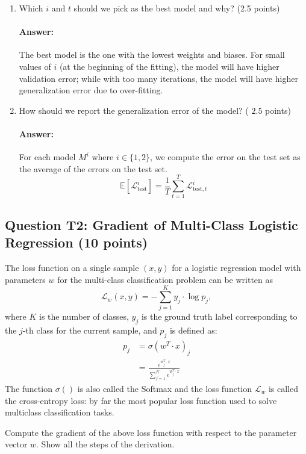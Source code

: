 \documentclass[10pt]{article}
\begin{document}
\begin{enumerate}
  \item Which $i$ and $t$ should we pick as the best model and why? (2.5 points)

  \paragraph{Answer:} The best model is the one with the lowest weights and biases. For small values of $i$ (at the beginning of the fitting), the model will have higher validation error; while with too many iterations, the model will have higher generalization error due to over-fitting.

  \item How should we report the generalization error of the model? ( $2.5$ points)

  \paragraph{Answer:} For each model $M^{i}$ where $i \in\{1,2\}$, we compute the error on the test set as the average of the errors on the test set.
  $$\mathbb{E}[\mathcal{L}_{\text {test}}^{i}] = \frac{1}{T} \sum^T_{t=1} \mathcal{L}_{\text {test}, t}^{i}$$


\end{enumerate}
\subsection*{Question T2: Gradient of Multi-Class Logistic Regression (10 points)}
The loss function on a single sample $(x, y)$ for a logistic regression model with parameters $w$ for the multi-class classification problem can be written as
$$
\mathcal{L}_{w}(x, y)=-\sum_{j=1}^{K} y_{j} \cdot \log p_{j},
$$
where $K$ is the number of classes, $y_{j}$ is the ground truth label corresponding to the $j$-th class for the current sample, and $p_{j}$ is defined as:
$$
\begin{aligned}
p_{j} &=\sigma\left(w^{T} \cdot x\right)_{j} \\
&=\frac{e^{w_{j}^{T} \cdot x}}{\sum_{j=1}^{K} e^{w_{j}^{T} \cdot x}}
\end{aligned}
$$
The function $\sigma()$ is also called the Softmax and the loss function $\mathcal{L}_{w}$ is called the cross-entropy loss: by far the most popular loss function used to solve multiclass classification tasks.

Compute the gradient of the above loss function with respect to the parameter vector $w$. Show all the steps of the derivation.
\end{document}
